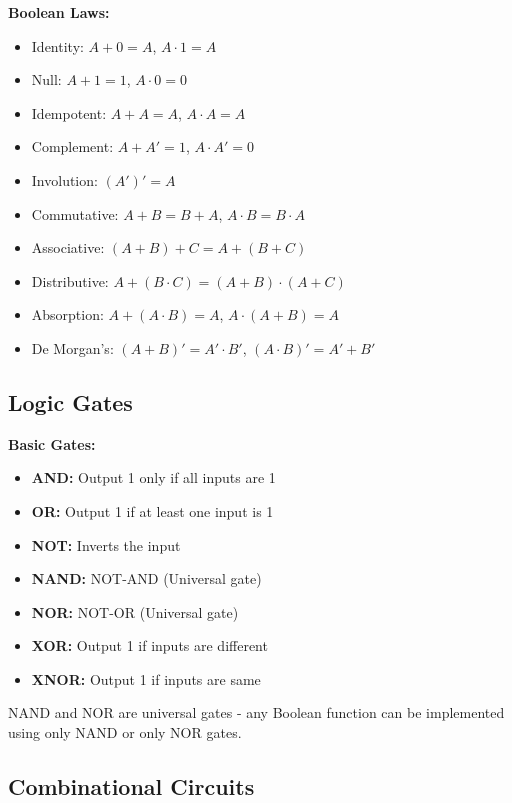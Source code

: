 \documentclass[11pt,a4paper]{article}
\begin{document}
\textbf{Boolean Laws:}
\begin{itemize}
    \item Identity: $A + 0 = A$, $A \cdot 1 = A$
    \item Null: $A + 1 = 1$, $A \cdot 0 = 0$
    \item Idempotent: $A + A = A$, $A \cdot A = A$
    \item Complement: $A + A' = 1$, $A \cdot A' = 0$
    \item Involution: $(A')' = A$
    \item Commutative: $A + B = B + A$, $A \cdot B = B \cdot A$
    \item Associative: $(A + B) + C = A + (B + C)$
    \item Distributive: $A + (B \cdot C) = (A + B) \cdot (A + C)$
    \item Absorption: $A + (A \cdot B) = A$, $A \cdot (A + B) = A$
    \item De Morgan's: $(A + B)' = A' \cdot B'$, $(A \cdot B)' = A' + B'$
\end{itemize}

\subsection{Logic Gates}

\textbf{Basic Gates:}
\begin{itemize}
    \item \textbf{AND:} Output 1 only if all inputs are 1
    \item \textbf{OR:} Output 1 if at least one input is 1
    \item \textbf{NOT:} Inverts the input
    \item \textbf{NAND:} NOT-AND (Universal gate)
    \item \textbf{NOR:} NOT-OR (Universal gate)
    \item \textbf{XOR:} Output 1 if inputs are different
    \item \textbf{XNOR:} Output 1 if inputs are same
\end{itemize}

\begin{notebox}
NAND and NOR are universal gates - any Boolean function can be implemented using only NAND or only NOR gates.
\end{notebox}

\subsection{Combinational Circuits}
\end{document}
